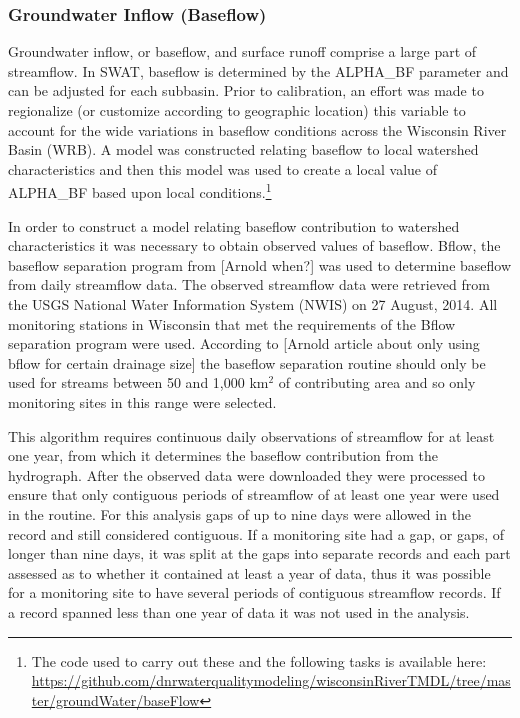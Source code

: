 \subsubsection{Groundwater Inflow (Baseflow)}
	Groundwater inflow, or baseflow, and surface runoff comprise a large part of streamflow. In SWAT, baseflow is determined by the ALPHA\_BF parameter and can be adjusted for each subbasin. Prior to calibration, an effort was made to regionalize (or customize according to geographic location) this variable to account for the wide variations in baseflow conditions across the Wisconsin River Basin (WRB). A model was constructed relating baseflow to local watershed characteristics and then this model was used to create a local value of ALPHA\_BF based upon local conditions.\footnote{The code used to carry out these and the following tasks is available here: \url{https://github.com/dnrwaterqualitymodeling/wisconsinRiverTMDL/tree/master/groundWater/baseFlow}}
	
	In order to construct a model relating baseflow contribution to watershed characteristics it was necessary to obtain observed values of baseflow. Bflow, the baseflow separation program from [Arnold when?] was used to determine baseflow from daily streamflow data. The observed streamflow data were retrieved from the USGS National Water Information System (NWIS) on 27 August, 2014. All monitoring stations in Wisconsin that met the requirements of the Bflow separation program were used.  According to [Arnold article about only using bflow for certain drainage size] the baseflow separation routine should only be used for streams between 50 and 1,000 km$^2$ of contributing area and so only monitoring sites in this range were selected.
	
	This algorithm requires continuous daily observations of streamflow for at least one year, from which it determines the baseflow contribution from the hydrograph.	After the observed data were downloaded they were processed to ensure that only contiguous periods of streamflow of at least one year were used in the routine. For this analysis gaps of up to nine days were allowed in the record and still considered contiguous. If a monitoring site had a gap, or gaps, of longer than nine days, it was split at the gaps into separate records and each part assessed as to whether it contained at least a year of data, thus it was possible for a monitoring site to have several periods of contiguous streamflow records. If a record spanned less than one year of data it was not used in the analysis.
	
